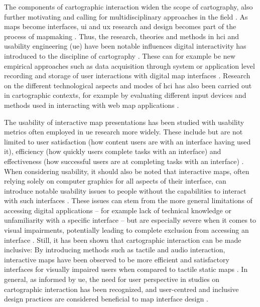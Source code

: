 The components of cartographic interaction widen the scope of cartography,
also further motivating and calling for
multidisciplinary approaches in the field \parencite{rot2013b}.
As maps become interfaces,
\acrshort{ui} and \acrshort{ux} research and design becomes
part of the process of mapmaking \parencite{rot2015}.
Thus, the research, theories and methods in \acrshort{hci}
and usability engineering (\acrshort{ue}) have been notable influences
digital interactivity has introduced to the discipline of cartography \parencite{rot2017}.
These can for example be new empirical approaches such as
data acquisition through system or application level recording and storage of
user interactions with digital map interfaces \parencite{oom2015}.
Research on the different technological aspects and modes of \acrshort{hci}
has also been carried out in cartographic contexts,
for example by evaluating different input devices and methods
used in interacting with web map applications \parencite{wu2011}.

The usability of interactive map presentations has been studied with
usability metrics often employed in \acrshort{ue} research more widely.
These include but are not limited to
user satisfaction (how content users are with an interface having used it),
efficiency (how quickly users complete tasks with an interface)
and effectiveness (how successful users are at completing tasks with an interface)
\parencite{col2009}.
When considering usability, it should also be noted that interactive maps,
often relying solely on computer graphics for all aspects of their interface,
can introduce notable usability issues
to people without the capabilities to interact with such interfaces \parencite{duc2018}.
These issues can stem from the more general limitations of accessing digital applications --
for example lack of technical knowledge or unfamiliarity with a specific interface \parencite{kul2019} --
but are especially severe when it comes to visual impairments,
potentially leading to complete exclusion from accessing an interface \parencite{duc2018}.
Still, it has been shown that cartographic interaction can be made inclusive:
By introducing methods such as tactile and audio interaction,
interactive maps have been observed to be more efficient and satisfactory interfaces
for visually impaired users when compared to tactile static maps \parencite{bro2015}.
In general, as informed by \acrshort{ue},
the need for user perspective in studies on cartographic interaction has been recognized,
and user-centred and inclusive design practices are considered beneficial to map interface design
\parencite{niv2007, rot2017, duc2018}.

